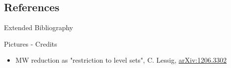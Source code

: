 \documentclass[beamer,handout,10pt]{standalone}
\begin{document}


\subsection{References}

\begin{frame}[t,allowframebreaks]{Extended Bibliography}
	
	
\end{frame}





\begin{frame}[t,allowframebreaks]{Pictures - Credits}
	\begin{itemize}
		\item MW reduction as "restriction to level sets", C. Lessig,
			\href{https://arxiv.org/abs/1206.3302}{arXiv:1206.3302}
	\end{itemize}
\end{frame}



\end{document}
